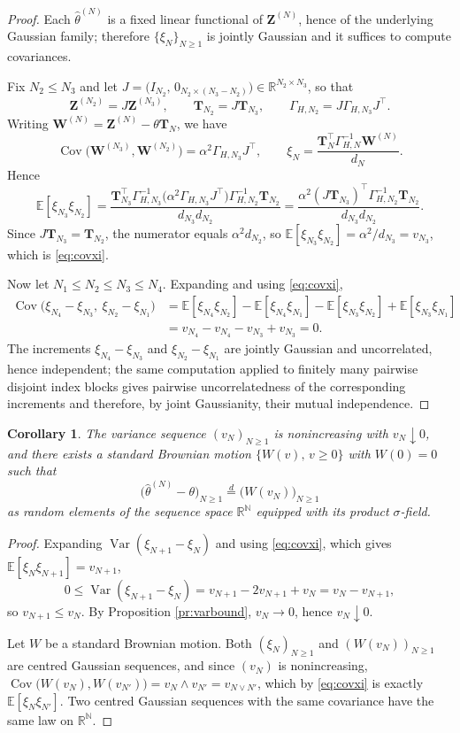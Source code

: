 \documentclass[11pt,reqno]{amsart}
\numberwithin{equation}{section}
\theoremstyle{plain}
\newtheorem{corollary}[theorem]{Corollary}
\theoremstyle{definition}
\theoremstyle{remark}
\newcommand{\bT}{\mathbf{T}}
\newcommand{\bZ}{\mathbf{Z}}
\newcommand{\bW}{\mathbf{W}}
\newcommand{\R}{\mathbb{R}}
\newcommand{\N}{\mathbb{N}}
\newcommand{\E}{\mathbb{E}}
\DeclareMathOperator{\Var}{Var}
\DeclareMathOperator{\Cov}{Cov}
\begin{document}
\begin{proof}
Each $\widehat\theta^{(N)}$ is a fixed linear functional of $\bZ^{(N)}$, hence of the
underlying Gaussian family; therefore $\{\xi_N\}_{N\ge1}$ is jointly Gaussian and it
suffices to compute covariances.

Fix $N_2\le N_3$ and let $J=\bigl(I_{N_2},\,0_{N_2\times(N_3-N_2)}\bigr)
\in\R^{N_2\times N_3}$, so that
\[
  \bZ^{(N_2)}=J\bZ^{(N_3)},\qquad \bT_{N_2}=J\bT_{N_3},\qquad
  \Gamma_{H,N_2}=J\Gamma_{H,N_3}J^{\top} .
\]
Writing $\bW^{(N)}=\bZ^{(N)}-\theta\bT_N$, we have
\[
  \Cov\bigl(\bW^{(N_3)},\bW^{(N_2)}\bigr)=\alpha^{2}\Gamma_{H,N_3}J^{\top},
  \qquad
  \xi_N=\frac{\bT_N^{\top}\Gamma_{H,N}^{-1}\bW^{(N)}}{d_N}.
\]
Hence
\[
  \E[\xi_{N_3}\xi_{N_2}]
  =\frac{\bT_{N_3}^{\top}\Gamma_{H,N_3}^{-1}
        \bigl(\alpha^{2}\Gamma_{H,N_3}J^{\top}\bigr)\Gamma_{H,N_2}^{-1}\bT_{N_2}}
        {d_{N_3}d_{N_2}}
  =\frac{\alpha^{2}(J\bT_{N_3})^{\top}\Gamma_{H,N_2}^{-1}\bT_{N_2}}{d_{N_3}d_{N_2}} .
\]
Since $J\bT_{N_3}=\bT_{N_2}$, the numerator equals $\alpha^{2}d_{N_2}$, so
$\E[\xi_{N_3}\xi_{N_2}]=\alpha^{2}/d_{N_3}=v_{N_3}$, which is \eqref{eq:covxi}.

Now let $N_1\le N_2\le N_3\le N_4$. Expanding and using \eqref{eq:covxi},
\[
\begin{aligned}
  \Cov\bigl(\xi_{N_4}-\xi_{N_3},\ \xi_{N_2}-\xi_{N_1}\bigr)
  &=\E[\xi_{N_4}\xi_{N_2}]-\E[\xi_{N_4}\xi_{N_1}]
    -\E[\xi_{N_3}\xi_{N_2}]+\E[\xi_{N_3}\xi_{N_1}]\\
  &=v_{N_4}-v_{N_4}-v_{N_3}+v_{N_3}=0 .
\end{aligned}
\]
The increments $\xi_{N_4}-\xi_{N_3}$ and $\xi_{N_2}-\xi_{N_1}$ are jointly Gaussian and
uncorrelated, hence independent; the same computation applied to finitely many pairwise
disjoint index blocks gives pairwise uncorrelatedness of the corresponding increments and
therefore, by joint Gaussianity, their mutual independence.
\end{proof}

\begin{corollary}\label{co:tcbm}
The variance sequence $(v_N)_{N\ge1}$ is nonincreasing with $v_N\downarrow0$, and there
exists a standard Brownian motion $\{W(v),\,v\ge0\}$ with $W(0)=0$ such that
\[
  \bigl(\widehat\theta^{(N)}-\theta\bigr)_{N\ge1}
  \overset{d}{=}\bigl(W(v_N)\bigr)_{N\ge1}
\]
as random elements of the sequence space $\R^{\N}$ equipped with its product
$\sigma$-field.
\end{corollary}

\begin{proof}
Expanding $\Var(\xi_{N+1}-\xi_N)$ and using \eqref{eq:covxi}, which gives
$\E[\xi_N\xi_{N+1}]=v_{N+1}$,
\[
  0\le\Var(\xi_{N+1}-\xi_N)=v_{N+1}-2v_{N+1}+v_N=v_N-v_{N+1},
\]
so $v_{N+1}\le v_N$. By Proposition \ref{pr:varbound}, $v_N\to0$, hence
$v_N\downarrow0$.

Let $W$ be a standard Brownian motion. Both $(\xi_N)_{N\ge1}$ and
$(W(v_N))_{N\ge1}$ are centred Gaussian sequences, and since $(v_N)$ is nonincreasing,
$\Cov\bigl(W(v_N),W(v_{N'})\bigr)=v_N\wedge v_{N'}=v_{N\vee N'}$, which by
\eqref{eq:covxi} is exactly $\E[\xi_N\xi_{N'}]$. Two centred Gaussian sequences with the
same covariance have the same law on $\R^{\N}$.
\end{proof}
\end{document}
